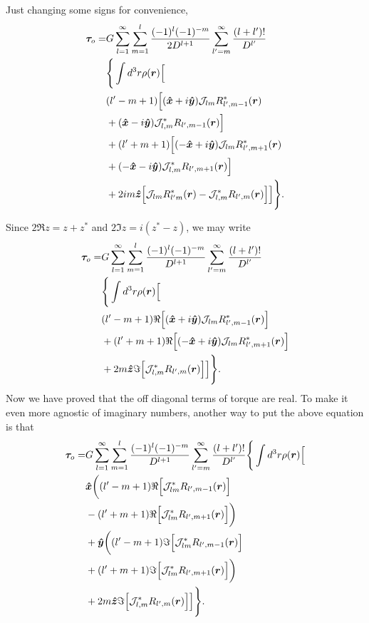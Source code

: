 \documentclass[aps,twocolumn,secnumarabic,balancelastpage,amsmath,amssymb,nofootinbib,floatfix]{revtex4-1}
\begin{document}
Just changing some signs for convenience,
\begin{equation*}
\begin{aligned}
\bm \tau_o = &G\sum_{l=1}^\infty \sum_{m=1}^l \frac{(-1)^l(-1)^{-m}}{2D^{l+1}}\sum_{l'=m}^\infty \frac{(l+l')!}{D^{l'}}\\
&\Bigg\{\int d^3 r\rho(\bm r)\Big[\\
&(l'-m+1)\Big[(\bm{\hat x} + i\bm{\hat y})\mathcal{J}_{lm} R^*_{l',m-1}(\bm r)\\
&+(\bm{\hat x}-i\bm{\hat y})\mathcal{J}_{l,m}^* R_{l',m-1}(\bm r)\Big]\\
&+(l'+m+1)\Big[(-\bm{\hat x}+i\bm{\hat y})\mathcal{J}_{lm} R^*_{l',m+1}(\bm r)\\
&+(-\bm{\hat x} - i\bm{\hat y})\mathcal{J}_{l,m}^* R_{l',m+1}(\bm r)\Big]\\
&+2im\bm{\hat z}\Big[\mathcal{J}_{lm} R^*_{l'm}(\bm r)-\mathcal{J}_{l,m}^* R_{l',m}(\bm r)\Big]\Big]\Bigg\}.
\end{aligned}
\end{equation*}

Since $2\Re z = z + z^*$ and $2\Im z = i(z^* - z)$, we may write
\begin{equation*}
\begin{aligned}
\bm \tau_o = &G\sum_{l=1}^\infty \sum_{m=1}^l \frac{(-1)^l(-1)^{-m}}{D^{l+1}}\sum_{l'=m}^\infty \frac{(l+l')!}{D^{l'}}\\
&\Bigg\{\int d^3 r\rho(\bm r)\Big[\\
&(l'-m+1)\Re\Big[(\bm{\hat x} + i\bm{\hat y})\mathcal{J}_{lm} R^*_{l',m-1}(\bm r)\Big]\\
&+(l'+m+1)\Re\Big[(-\bm{\hat x}+i\bm{\hat y})\mathcal{J}_{lm} R^*_{l',m+1}(\bm r)\Big]\\
&+2m\bm{\hat z}\Im\Big[\mathcal{J}_{l,m}^* R_{l',m}(\bm r)\Big]\Big]\Bigg\}.
\end{aligned}
\end{equation*}
Now we have proved that the off diagonal terms of torque are real. To make it even more agnostic of imaginary numbers, another way to put the above equation is that
\begin{equation*}
\begin{aligned}
\bm \tau_o = &G\sum_{l=1}^\infty \sum_{m=1}^l \frac{(-1)^l(-1)^{-m}}{D^{l+1}}\sum_{l'=m}^\infty \frac{(l+l')!}{D^{l'}}\Bigg\{\int d^3 r\rho(\bm r)\Big[\\
&\bm{\hat x}\bigg((l'-m+1)\Re\Big[\mathcal{J}^*_{lm} R_{l',m-1}(\bm r)\Big]\\
&-(l'+m+1)\Re\Big[\mathcal{J}^*_{lm} R_{l',m+1}(\bm r)\Big]\bigg)\\
&+\bm{\hat y}\bigg((l'-m+1)\Im\Big[\mathcal{J}^*_{lm} R_{l',m-1}(\bm r)\Big]\\
&+(l'+m+1)\Im\Big[\mathcal{J}^*_{lm} R_{l',m+1}(\bm r)\Big]\bigg)\\
&+2m\bm{\hat z}\Im\Big[\mathcal{J}_{l,m}^* R_{l',m}(\bm r)\Big]\Big]\Bigg\}.
\end{aligned}
\end{equation*}
\end{document}
